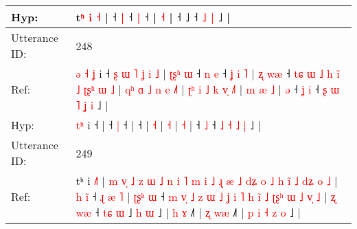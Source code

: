 \documentclass[10pt]{article}
\DeclareRobustCommand{\hl}[1]{{\textcolor{red}{#1}}}
\begin{document}
\begin{longtable}{ll}
 \\
Hyp: & \hl{}\hl{}\hl{}\hl{}\hl{}\hl{}\hl{}\hl{}\hl{}\hl{}\hl{}\hl{}\hl{}\hl{}\hl{}\hl{}\hl{}\hl{}\hl{}\hl{}\hl{}t\hl{ʰ} \hl{i} \hl{˧} |\hl{}\hl{}\hl{}\hl{} ˧\hl{}\hl{} \hl{|} ˧\hl{}\hl{}\hl{}\hl{} \hl{|} ˧\hl{} |\hl{}\hl{}\hl{} \hl{}\hl{˧} |\hl{}\hl{}\hl{}\hl{} ˧\hl{}\hl{}\hl{}\hl{} ˩\hl{}\hl{}\hl{}\hl{}\hl{}\hl{}\hl{}\hl{} ˧\hl{}\hl{}\hl{}\hl{}\hl{}\hl{}\hl{} \hl{˩} \hl{|} ˩ |
 \\
\midrule
Utterance ID: & 248 \\
Ref: & \hl{ə}\hl{ }\hl{˧}\hl{ }\hl{ʝ} i ˧\hl{ }\hl{ʂ}\hl{ }\hl{ɯ}\hl{ }\hl{˥}\hl{ }\hl{ʝ}\hl{ }\hl{i}\hl{ }\hl{˩} |\hl{ }\hl{ʈ}\hl{ʂ}\hl{ʰ}\hl{ }\hl{ɯ} ˧\hl{ }\hl{n} \hl{e} ˧\hl{ }\hl{ʝ}\hl{ }\hl{i}\hl{ }\hl{˥} |\hl{ }\hl{ʐ}\hl{ }\hl{w}\hl{æ} ˧\hl{ }\hl{t}\hl{ɕ}\hl{ }\hl{ɯ}\hl{ }\hl{˩}\hl{ }\hl{h}\hl{ }\hl{i}\hl{̃}\hl{ }\hl{˩}\hl{ }\hl{ʈ}\hl{ʂ}\hl{ʰ}\hl{ }\hl{ɯ}\hl{ }\hl{˩} |\hl{ }\hl{q}\hl{ʰ}\hl{ }\hl{ɑ}\hl{ }\hl{˩}\hl{ }\hl{n}\hl{ }\hl{e} \hl{˩}\hl{˥} |\hl{ }\hl{ʈ}\hl{ʰ}\hl{ }\hl{i}\hl{ }\hl{˩}\hl{ }\hl{k}\hl{ }\hl{v}\hl{̩} \hl{˩}\hl{˥} |\hl{ }\hl{m}\hl{ }\hl{æ} \hl{˩} |\hl{ }\hl{ə} ˧\hl{ }\hl{ʝ} \hl{i} ˧\hl{ }\hl{ʂ} \hl{ɯ} \hl{˥} \hl{ʝ} \hl{i} ˩ |
 \\
Hyp: & \hl{}\hl{}\hl{}\hl{t}\hl{ʰ} i ˧\hl{}\hl{}\hl{}\hl{}\hl{}\hl{}\hl{}\hl{}\hl{}\hl{}\hl{}\hl{} |\hl{}\hl{}\hl{}\hl{}\hl{}\hl{} ˧\hl{}\hl{} \hl{|} ˧\hl{}\hl{}\hl{}\hl{}\hl{}\hl{} |\hl{}\hl{}\hl{}\hl{}\hl{} ˧\hl{}\hl{}\hl{}\hl{}\hl{}\hl{}\hl{}\hl{}\hl{}\hl{}\hl{}\hl{}\hl{}\hl{}\hl{}\hl{}\hl{}\hl{}\hl{}\hl{}\hl{}\hl{} |\hl{}\hl{}\hl{}\hl{}\hl{}\hl{}\hl{}\hl{}\hl{}\hl{}\hl{} \hl{}\hl{˧} |\hl{}\hl{}\hl{}\hl{}\hl{}\hl{}\hl{}\hl{}\hl{}\hl{}\hl{}\hl{} \hl{}\hl{˧} |\hl{}\hl{}\hl{}\hl{} \hl{˧} |\hl{}\hl{} ˧\hl{}\hl{} \hl{˩} ˧\hl{}\hl{} \hl{˩} \hl{˧} \hl{˩} \hl{|} ˩ |
 \\
\midrule
Utterance ID: & 249 \\
Ref: & tʰ i \hl{˩}\hl{˥} |\hl{ }\hl{m}\hl{ }\hl{v}\hl{̩}\hl{ }\hl{˩}\hl{ }\hl{z}\hl{ }\hl{ɯ}\hl{ }\hl{˩}\hl{ }\hl{n}\hl{ }\hl{i}\hl{ }\hl{˥}\hl{ }\hl{m}\hl{ }\hl{i}\hl{ }\hl{˩}\hl{ }\hl{ɻ}\hl{ }\hl{æ}\hl{ }\hl{˩}\hl{ }\hl{d}\hl{ʑ}\hl{ }\hl{o}\hl{ }\hl{˩}\hl{ }\hl{h}\hl{ }\hl{i}\hl{̃}\hl{ }\hl{˩}\hl{ }\hl{d}\hl{ʑ}\hl{ }\hl{o} \hl{˩} |\hl{ }\hl{h}\hl{ }\hl{i}\hl{̃} ˧\hl{ }\hl{ɻ} \hl{æ} \hl{˥} | \hl{ʈ}\hl{ʂ}\hl{ʰ} \hl{ɯ} ˧\hl{ }\hl{m} \hl{v}\hl{̩} \hl{˩} \hl{z} \hl{ɯ} \hl{˩} \hl{ʝ} \hl{i} \hl{˥} \hl{h} \hl{i}\hl{̃} \hl{˩} \hl{ʈ}\hl{ʂ}\hl{ʰ} \hl{ɯ} \hl{˩} \hl{v}\hl{̩} \hl{˩} | \hl{ʐ} \hl{w}\hl{æ} ˧ \hl{t}\hl{ɕ} \hl{ɯ} ˩\hl{ }\hl{h} \hl{ɯ} ˩ |\hl{ }\hl{h}\hl{ }\hl{ɤ} ˩\hl{˥} |\hl{ }\hl{ʐ}\hl{ }\hl{w}\hl{æ} ˩\hl{˥} |\hl{ }\hl{p}\hl{ }\hl{i}\hl{ }\hl{˧}\hl{ }\hl{z}\hl{ }\hl{o} ˩ |

\end{longtable}
\end{document}
